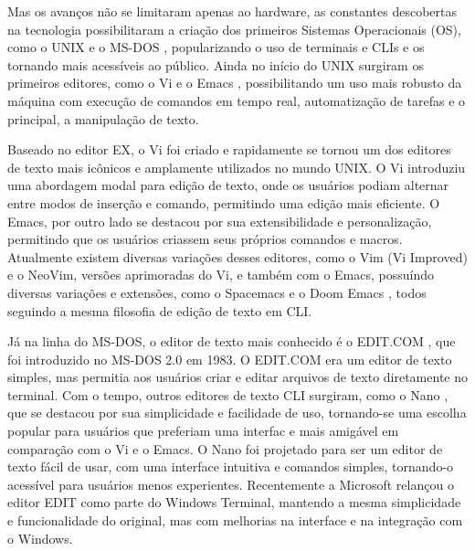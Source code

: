 Mas os avanços não se limitaram apenas ao hardware, as constantes descobertas na
tecnologia possibilitaram a criação dos primeiros Sistemas Operacionais (OS),
como o UNIX \cite{UnixArchive} e o MS-DOS \cite{ComputerHistoryMuseum}, popularizando
o uso de terminais e CLIs e os tornando mais acessíveis ao público. Ainda no
início do UNIX surgiram os primeiros editores, como o Vi \cite{Joy_Vi} e o Emacs
\cite{Stallman1981}, possibilitando um uso mais robusto da máquina com execução
de comandos em tempo real, automatização de tarefas e o principal, a manipulação
de texto.

Baseado no editor EX, o Vi foi criado e rapidamente se tornou um dos editores de
texto mais icônicos e amplamente utilizados no mundo UNIX. O Vi introduziu uma
abordagem modal para edição de texto, onde os usuários podiam alternar entre modos
de inserção e comando, permitindo uma edição mais eficiente. O Emacs, por outro
lado se destacou por sua extensibilidade e personalização, permitindo que os usuários
criassem seus próprios comandos e macros. Atualmente existem diversas variações
desses editores, como o Vim (Vi Improved) \cite{Vim} e o NeoVim,
\cite{Neovim_Project} versões aprimoradas do Vi, e também com o Emacs, possuíndo
diversas variações e extensões, como o Spacemacs \cite{Spacemacs} e o Doom Emacs
\cite{DoomEmacs}, todos seguindo a mesma filosofia de edição de texto em CLI.

Já na linha do MS-DOS, o editor de texto mais conhecido é o EDIT.COM \cite{MicrosoftEdit2025},
que foi introduzido no MS-DOS 2.0 em 1983. O EDIT.COM era um editor de texto
simples, mas permitia aos usuários criar e editar arquivos de texto diretamente no
terminal. Com o tempo, outros editores de texto CLI surgiram, como o Nano
\cite{Nano2025}, que se destacou por sua simplicidade e facilidade de uso,
tornando-se uma escolha popular para usuários que preferiam uma interfac e mais
amigável em comparação com o Vi e o Emacs. O Nano foi projetado para ser um editor
de texto fácil de usar, com uma interface intuitiva e comandos simples, tornando-o
acessível para usuários menos experientes. Recentemente a Microsoft relançou o
editor EDIT como parte do Windows Terminal, mantendo a mesma simplicidade e funcionalidade
do original, mas com melhorias na interface e na integração com o Windows.

